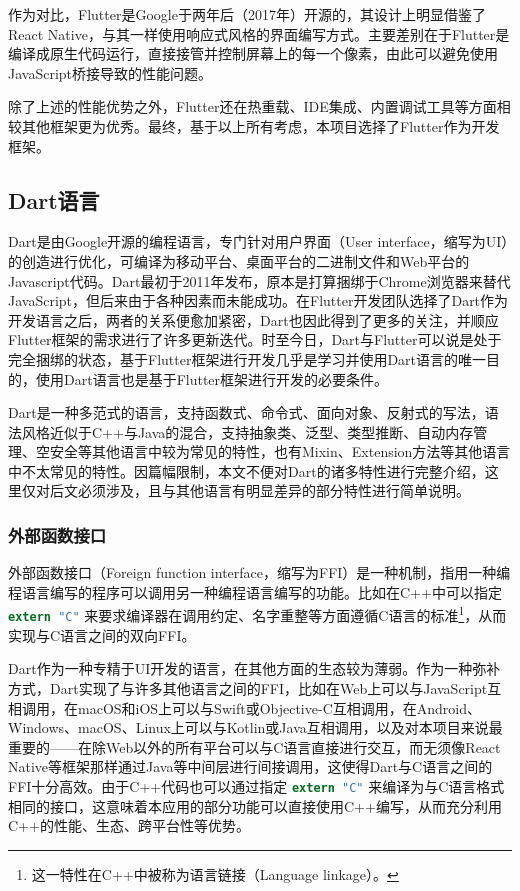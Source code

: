 作为对比，Flutter是Google于两年后（2017年）开源的，其设计上明显借鉴了React Native，与其一样使用响应式风格的界面编写方式。主要差别在于Flutter是编译成原生代码运行，直接接管并控制屏幕上的每一个像素，由此可以避免使用JavaScript桥接导致的性能问题。

除了上述的性能优势之外，Flutter还在热重载、IDE集成、内置调试工具等方面相较其他框架更为优秀。最终，基于以上所有考虑，本项目选择了Flutter作为开发框架。

\subsection{Dart语言}\label{subsec:dart}

Dart是由Google开源的编程语言，专门针对用户界面（User interface，缩写为UI）的创造进行优化，可编译为移动平台、桌面平台的二进制文件和Web平台的Javascript代码\cite{DartLanguageEvolution2023}。Dart最初于2011年发布，原本是打算捆绑于Chrome浏览器来替代JavaScript，但后来由于各种因素而未能成功。在Flutter开发团队选择了Dart作为开发语言之后，两者的关系便愈加紧密，Dart也因此得到了更多的关注，并顺应Flutter框架的需求进行了许多更新迭代。时至今日，Dart与Flutter可以说是处于完全捆绑的状态，基于Flutter框架进行开发几乎是学习并使用Dart语言的唯一目的，使用Dart语言也是基于Flutter框架进行开发的必要条件。

Dart是一种多范式的语言，支持函数式、命令式、面向对象、反射式的写法，语法风格近似于C++与Java的混合，支持抽象类、泛型、类型推断、自动内存管理、空安全等其他语言中较为常见的特性，也有Mixin、Extension方法等其他语言中不太常见的特性。因篇幅限制，本文不便对Dart的诸多特性进行完整介绍，这里仅对后文必须涉及，且与其他语言有明显差异的部分特性进行简单说明。

\subsubsection{外部函数接口}\label{subsubsec:ffi}

外部函数接口（Foreign function interface，缩写为FFI）是一种机制，指用一种编程语言编写的程序可以调用另一种编程语言编写的功能。比如在C++中可以指定 \lstinline[language=C]{extern "C"} 来要求编译器在调用约定、名字重整等方面遵循C语言的标准\footnote{这一特性在C++中被称为语言链接（Language linkage）。}，从而实现与C语言之间的双向FFI。

Dart作为一种专精于UI开发的语言，在其他方面的生态较为薄弱。作为一种弥补方式，Dart实现了与许多其他语言之间的FFI，比如在Web上可以与JavaScript互相调用，在macOS和iOS上可以与Swift或Objective-C互相调用，在Android、Windows、macOS、Linux上可以与Kotlin或Java互相调用，以及对本项目来说最重要的——在除Web以外的所有平台可以与C语言直接进行交互，而无须像React Native等框架那样通过Java等中间层进行间接调用，这使得Dart与C语言之间的FFI十分高效。由于C++代码也可以通过指定 \lstinline[language=C]{extern "C"} 来编译为与C语言格式相同的接口，这意味着本应用的部分功能可以直接使用C++编写，从而充分利用C++的性能、生态、跨平台性等优势。

